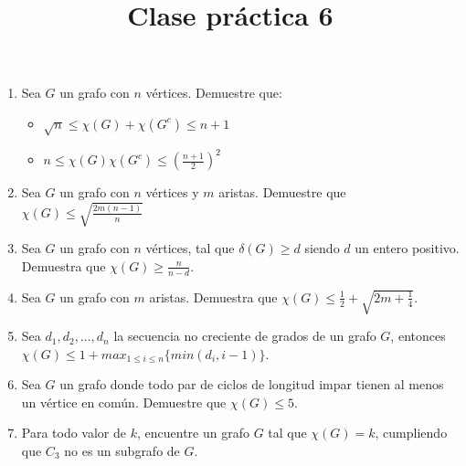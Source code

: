 \documentclass{article}
\begin{document}
\title{Clase pr\'actica 6}
\maketitle

\begin{enumerate}
    \item Sea $G$ un grafo con $n$ vértices. Demuestre que:
        \begin{itemize}
            \item $\sqrt{n} \leq \chi(G) + \chi(G^c) \leq n + 1$
            \item $n \leq \chi(G) \chi(G^c) \leq (\frac{n+1}{2})^2$
        \end{itemize}
    \item  Sea $G$ un grafo con $n$ vértices y $m$ aristas. Demuestre que $\chi(G) \leq \sqrt{\frac{2m(n-1)}{n}}$
    \item Sea $G$ un grafo con $n$ vértices, tal que $\delta(G) \geq d$ siendo $d$ un entero positivo. Demuestra que $\chi(G) \geq \frac{n}{n-d}$.
    \item Sea $G$ un grafo con $m$ aristas. Demuestra que $\chi(G) \leq \frac{1}{2} + \sqrt{2m + \frac{1}{4}}$.
    \item Sea $d_1, d_2, ..., d_n$ la secuencia no creciente de grados de un grafo $G$, entonces $\chi(G) \leq 1 + max_{1 \leq i \leq n} \{min(d_i, i-1)\}$.
    \item Sea $G$ un grafo donde todo par de ciclos de longitud impar tienen al menos un vértice en común. Demuestre que $\chi(G) \leq 5$.
    \item Para todo valor de $k$, encuentre un grafo $G$ tal que $\chi(G) = k$, cumpliendo que $C_3$ no es un subgrafo de $G$.
\end{enumerate}
\end{document}
